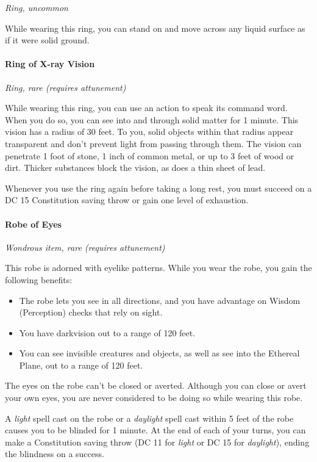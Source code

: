 \documentclass[
]{article}
\providecommand{\tightlist}{%
  \setlength{\itemsep}{0pt}\setlength{\parskip}{0pt}}
\begin{document}
\emph{Ring, uncommon}

While wearing this ring, you can stand on and move across any liquid
surface as if it were solid ground.

\hypertarget{ring-of-x-ray-vision}{%
\paragraph{Ring of X-ray Vision}\label{ring-of-x-ray-vision}}

\emph{Ring, rare (requires attunement)}

While wearing this ring, you can use an action to speak its command
word. When you do so, you can see into and through solid matter for 1
minute. This vision has a radius of 30 feet. To you, solid objects
within that radius appear transparent and don't prevent light from
passing through them. The vision can penetrate 1 foot of stone, 1 inch
of common metal, or up to 3 feet of wood or dirt. Thicker substances
block the vision, as does a thin sheet of lead.

Whenever you use the ring again before taking a long rest, you must
succeed on a DC 15 Constitution saving throw or gain one level of
exhaustion.

\hypertarget{robe-of-eyes}{%
\paragraph{Robe of Eyes}\label{robe-of-eyes}}

\emph{Wondrous item, rare (requires attunement)}

This robe is adorned with eyelike patterns. While you wear the robe, you
gain the following benefits:

\begin{itemize}
\tightlist
\item
  The robe lets you see in all directions, and you have advantage on
  Wisdom (Perception) checks that rely on sight.
\item
  You have darkvision out to a range of 120 feet.
\item
  You can see invisible creatures and objects, as well as see into the
  Ethereal Plane, out to a range of 120 feet.
\end{itemize}

The eyes on the robe can't be closed or averted. Although you can close
or avert your own eyes, you are never considered to be doing so while
wearing this robe.

A \emph{light} spell cast on the robe or a \emph{daylight} spell cast
within 5 feet of the robe causes you to be blinded for 1 minute. At the
end of each of your turns, you can make a Constitution saving throw (DC
11 for \emph{light} or DC 15 for \emph{daylight}), ending the blindness
on a success.
\end{document}
